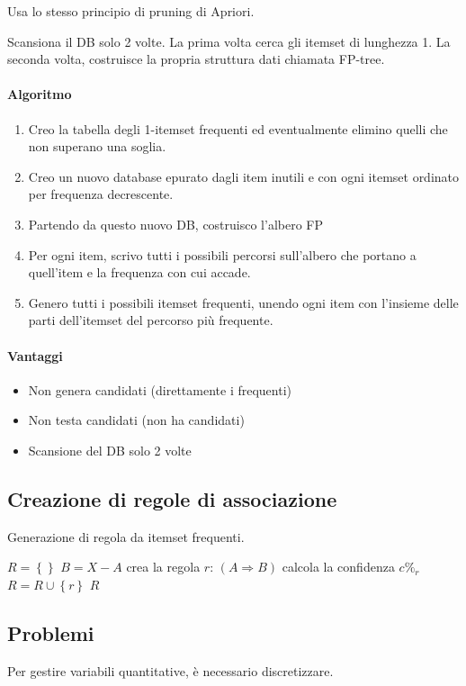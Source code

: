 \documentclass[11pt,onecolumn,a4paper,oneside]{book}
\begin{document}
Usa lo stesso principio di pruning di Apriori.

Scansiona il DB solo 2 volte. La prima volta cerca gli itemset di lunghezza 1. La seconda volta, costruisce la propria struttura dati chiamata FP-tree.

\paragraph{Algoritmo}
\begin{enumerate}
\item Creo la tabella degli 1-itemset frequenti ed eventualmente elimino quelli che non superano una soglia.
\item Creo un nuovo database epurato dagli item inutili e con ogni itemset ordinato per frequenza decrescente.
\item Partendo da questo nuovo DB, costruisco l'albero FP
\item Per ogni item, scrivo tutti i possibili percorsi sull'albero che portano a quell'item e la frequenza con cui accade.
\item Genero tutti i possibili itemset frequenti, unendo ogni item con l'insieme delle parti dell'itemset del percorso più frequente.
\end{enumerate}

\paragraph{Vantaggi}
\begin{itemize}
\item Non genera candidati (direttamente i frequenti)
\item Non testa candidati (non ha candidati)
\item Scansione del DB solo 2 volte 
\end{itemize}

\subsection{Creazione di regole di associazione}

\begin{algorithm}
\caption{Generazione di regola da itemset frequenti.}
\begin{algorithmic}
\STATE $R = \left\lbrace \right\rbrace$
\STATE $B = X - A $
\STATE crea la regola $r$: $\left( A \Rightarrow B \right)$
\STATE calcola la confidenza $c\%_r$
\STATE $R = R \cup \left\lbrace r \right\rbrace$
\ENDIF
\ENDFOR
\ENDFOR
\RETURN $R$
\end{algorithmic}
\end{algorithm}

\subsection{Problemi}
Per gestire variabili quantitative, è necessario discretizzare.
\end{document}
